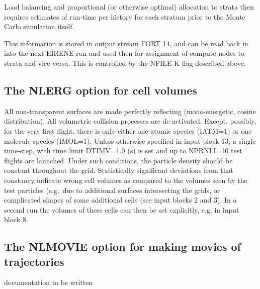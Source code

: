 Load balancing and proportional (or otherwise optimal) allocation to strata
then requires estimates of run-time per history for each stratum prior to the
Monte Carlo simulation itself.

This information is stored in output stream FORT 14, and can be read back in
into the next EIRENE run and used then for assignment of compute nodes to
strata and vice versa.
This is controlled by the NFILE-K flag described above.

\subsection{The NLERG option for cell volumes}\label{NLERG}

All non-transparent surfaces are made perfectly reflecting (mono-energetic,
cosine distribution).
All volumetric collision processes are de-activated.
Except, possibly, for the very first flight, there is only either one atomic
species (IATM=1) or one molecule species (IMOL=1).
Unless otherwise specified in input block 13, a single time-step, with time
limit DTIMV=\num{1.0} (\si{\second}) is set and up to NPRNLI=10 test flights
are launched.
Under such conditions, the particle density should be constant throughout the
grid.
Statistically significant deviations from that constancy indicate wrong cell
volumes as compared to the volumes seen by the test particles (e.g.\ due to
additional surfaces intersecting the grids, or complicated shapes of some
additional cells (see input blocks 2 and 3).
In a second run the volumes of these cells can then be set explicitly, e.g. in
input block 8.

\subsection{The NLMOVIE option for making movies of trajectories}\label{NLMOVIE}

documentation to be written

